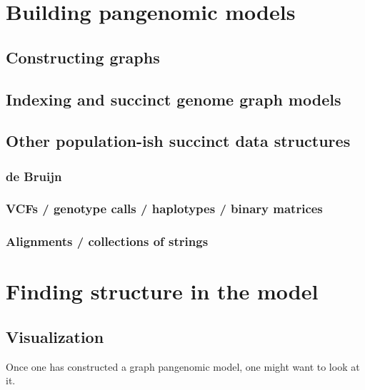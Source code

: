 \section{Building pangenomic models}

\subsection{Constructing graphs} 

\subsection{Indexing and succinct genome graph models}

\subsection{Other population-ish succinct data structures}

\subsubsection{de Bruijn}

\subsubsection{VCFs / genotype calls / haplotypes / binary matrices}

\subsubsection{Alignments / collections of strings}


\section{Finding structure in the model}

\subsection{Visualization}

Once one has constructed a graph pangenomic model, one might want to look at it.

